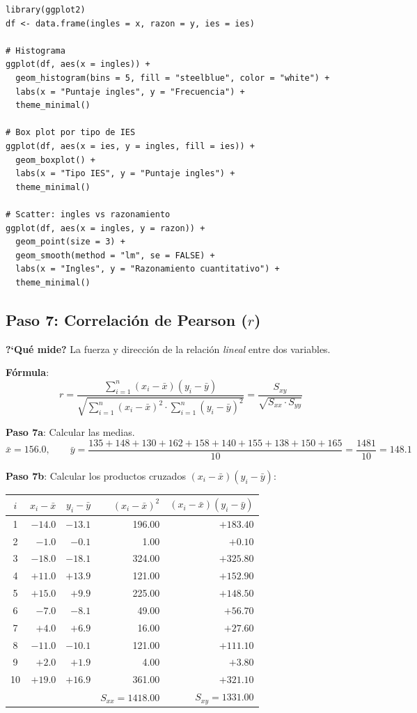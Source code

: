 \documentclass[11pt, a4paper]{article}
\begin{document}
\begin{lstlisting}
library(ggplot2)
df <- data.frame(ingles = x, razon = y, ies = ies)

# Histograma
ggplot(df, aes(x = ingles)) +
  geom_histogram(bins = 5, fill = "steelblue", color = "white") +
  labs(x = "Puntaje ingles", y = "Frecuencia") +
  theme_minimal()

# Box plot por tipo de IES
ggplot(df, aes(x = ies, y = ingles, fill = ies)) +
  geom_boxplot() +
  labs(x = "Tipo IES", y = "Puntaje ingles") +
  theme_minimal()

# Scatter: ingles vs razonamiento
ggplot(df, aes(x = ingles, y = razon)) +
  geom_point(size = 3) +
  geom_smooth(method = "lm", se = FALSE) +
  labs(x = "Ingles", y = "Razonamiento cuantitativo") +
  theme_minimal()
\end{lstlisting}

\subsection{Paso 7: Correlaci\'on de Pearson ($r$)}

\textbf{?`Qu\'e mide?} La fuerza y direcci\'on de la relaci\'on \emph{lineal} entre dos variables.

\textbf{F\'ormula}:
\[
r = \frac{\sum_{i=1}^{n}(x_i - \bar{x})(y_i - \bar{y})}
         {\sqrt{\sum_{i=1}^{n}(x_i - \bar{x})^2 \cdot \sum_{i=1}^{n}(y_i - \bar{y})^2}}
= \frac{S_{xy}}{\sqrt{S_{xx} \cdot S_{yy}}}
\]

\textbf{Paso 7a}: Calcular las medias.
\[
\bar{x} = 156.0, \qquad \bar{y} = \frac{135+148+130+162+158+140+155+138+150+165}{10} = \frac{1481}{10} = 148.1
\]

\textbf{Paso 7b}: Calcular los productos cruzados $(x_i - \bar{x})(y_i - \bar{y})$:

\begin{center}
\small
\begin{tabular}{crrrr}
\toprule
$i$ & $x_i - \bar{x}$ & $y_i - \bar{y}$ & $(x_i-\bar{x})^2$ & $(x_i-\bar{x})(y_i-\bar{y})$ \\
\midrule
1 & $-14.0$ & $-13.1$ & 196.00 & $+183.40$ \\
2 & $-1.0$  & $-0.1$  & 1.00   & $+0.10$ \\
3 & $-18.0$ & $-18.1$ & 324.00 & $+325.80$ \\
4 & $+11.0$ & $+13.9$ & 121.00 & $+152.90$ \\
5 & $+15.0$ & $+9.9$  & 225.00 & $+148.50$ \\
6 & $-7.0$  & $-8.1$  & 49.00  & $+56.70$ \\
7 & $+4.0$  & $+6.9$  & 16.00  & $+27.60$ \\
8 & $-11.0$ & $-10.1$ & 121.00 & $+111.10$ \\
9 & $+2.0$  & $+1.9$  & 4.00   & $+3.80$ \\
10 & $+19.0$ & $+16.9$ & 361.00 & $+321.10$ \\
\midrule
 & & & $S_{xx} = 1418.00$ & $S_{xy} = 1331.00$ \\
\bottomrule
\end{tabular}
\end{center}
\end{document}
